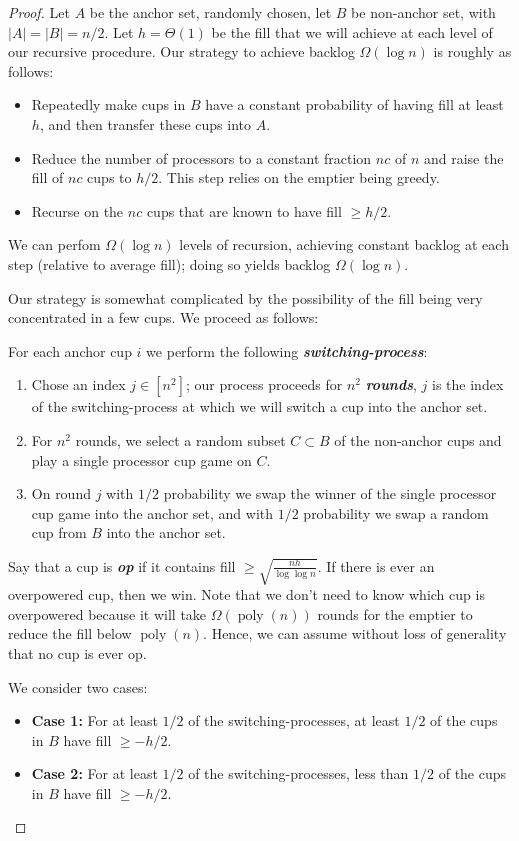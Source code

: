 \documentclass[twocolumn]{article}[11pt]
\newcommand{\defn}[1]{{\textit{\textbf{\boldmath #1}}}}
\DeclareMathOperator{\poly}{\text{poly}}
\begin{document}
\begin{proof}
  Let $A$ be the anchor set, randomly chosen, let $B$ be non-anchor set, with
  $|A| = |B| = n/2$. Let $h = \Theta(1)$ be the fill that we will achieve at
  each level of our recursive procedure.
Our strategy to achieve backlog $\Omega(\log n)$ is roughly as follows:
\begin{itemize}
  \item Repeatedly make cups in $B$ have a constant probability of having
    fill at least $h$, and then transfer these cups into $A$.
  \item Reduce the number of processors to a constant fraction $nc$ of $n$ and
    raise the fill of $nc$ cups to $h/2$. This step relies on the emptier being
    greedy.
  \item Recurse on the $nc$ cups that are known to have fill $\ge h/2$.
\end{itemize}
We can perfom $\Omega(\log n)$ levels of recursion, achieving constant backlog
at each step (relative to average fill); doing so yields backlog $\Omega(\log
n)$.

Our strategy is somewhat complicated by the possibility of the fill being very
concentrated in a few cups. We proceed as follows:

For each anchor cup $i$ we perform the following \defn{switching-process}:
\begin{enumerate}
  \item Chose an index $j \in [n^2]$; our process proceeds for $n^2$
    \defn{rounds}, $j$ is the index of the switching-process at which we will
    switch a cup into the anchor set.
  \item For $n^2$ rounds, we select a random subset $C\subset B$ of the
    non-anchor cups and play a single processor cup game on $C$.
  \item On round $j$ with $1/2$ probability we swap the winner of the single
    processor cup game into the anchor set, and with $1/2$ probability we swap
    a random cup from $B$ into the anchor set.
\end{enumerate}

Say that a cup is \defn{op} if it contains fill $\ge \sqrt{\frac{nh}{\log\log
n}}$. If there is ever an overpowered cup, then we win. Note that we don't need to
know which cup is overpowered because it will take $\Omega(\poly(n))$ rounds for the
emptier to reduce the fill below $\poly(n)$. Hence, we can assume without loss
of generality that no cup is ever op.

We consider two cases:
\begin{itemize}
  \item \textbf{Case 1:} For at least $1/2$ of the switching-processes, at
    least $1/2$ of the cups in $B$ have fill $\ge -h/2$.
  \item \textbf{Case 2:} For at least $1/2$ of the switching-processes, less
    than $1/2$ of the cups in $B$ have fill $\ge -h/2$.
\end{itemize}


\end{proof}
\end{document}
